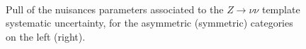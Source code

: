 \begin{figure}[tbhp]
    \caption{Pull of the nuisances parameters associated to the $Z\rightarrow\nu\nu$ template systematic uncertainty, 
      for the asymmetric (symmetric) categories on the left (right).
      \label{fig:nuisPull_TemplateZinv}}
  \begin{center}
     \\
  \end{center}
\end{figure}


